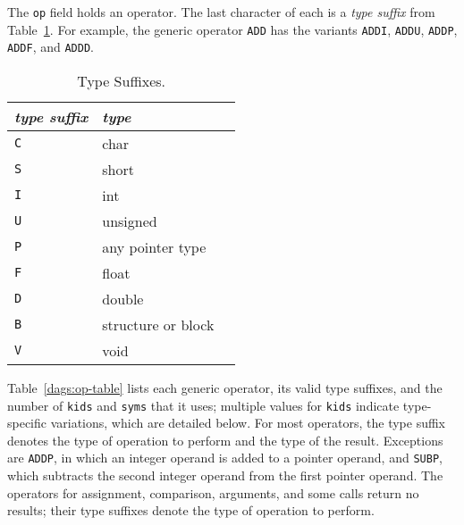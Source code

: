 The \verb|op| field holds an operator. The last character of each is a
{\em type suffix} from Table~\ref{dags:suffix-table}.
For example, the generic operator \verb|ADD| has the variants
\verb|ADDI|, \verb|ADDU|, \verb|ADDP|, \verb|ADDF|, and \verb|ADDD|.

\begin{table}
\begin{center}
\begin{tabular}{lll}
\em type suffix	& \em type \\ \hline
\tt C		& char \\
\tt S		& short \\
\tt I		& int \\
\tt U		& unsigned \\
\tt P		& any pointer type \\
\tt F		& float \\
\tt D		& double \\
\tt B		& structure or block \\
\tt V		& void \\
\end{tabular}
\end{center}
\caption{Type Suffixes.\label{dags:suffix-table}}
\end{table}

Table~\ref{dags:op-table} lists each generic operator, its valid type
suffixes, and the number of \verb|kids| and \verb|syms| that it uses;
multiple values for \verb|kids| indicate type-specific variations,
which are detailed below.  For most operators, the type suffix denotes
the type of operation to perform and the type of the result.
Exceptions are \verb|ADDP|, in which an integer operand
is added to a pointer operand, and \verb|SUBP|, which
subtracts the second integer operand from the first pointer operand.
The operators for assignment, comparison, arguments, and some calls return
no results; their type suffixes denote the type of operation to perform.

